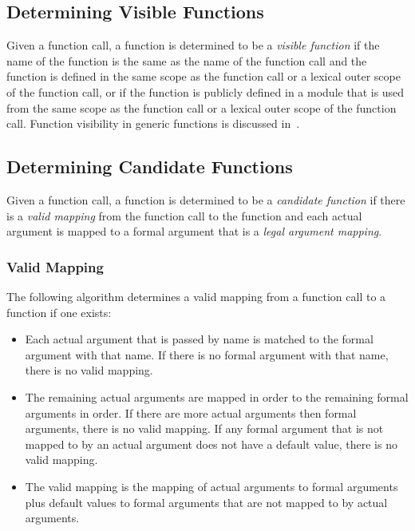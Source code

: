 \subsection{Determining Visible Functions}
\label{Determining_Visible_Functions}

Given a function call, a function is determined to be a \emph{visible
function} if the name of the function is the same as the name of the
function call and the function is defined in the same scope as the
function call or a lexical outer scope of the function call, or if the
function is publicly defined in a module that is used from the same
scope as the function call or a lexical outer scope of the function
call.  Function visibility in generic functions is discussed
in~.

\subsection{Determining Candidate Functions}
\label{Determining_Candidate_Functions}

Given a function call, a function is determined to be
a \emph{candidate function} if there is a \emph{valid mapping} from
the function call to the function and each actual argument is mapped
to a formal argument that is a \emph{legal argument mapping}.

\subsubsection{Valid Mapping}
\label{Valid_Mapping}

The following algorithm determines a valid mapping from a function
call to a function if one exists:
\begin{itemize}
\item
Each actual argument that is passed by name is matched to the formal
argument with that name.  If there is no formal argument with that
name, there is no valid mapping.
\item
The remaining actual arguments are mapped in order to the remaining
formal arguments in order.  If there are more actual arguments then
formal arguments, there is no valid mapping.  If any formal argument
that is not mapped to by an actual argument does not have a default
value, there is no valid mapping.
\item
The valid mapping is the mapping of actual arguments to formal
arguments plus default values to formal arguments that are not mapped
to by actual arguments.
\end{itemize}

